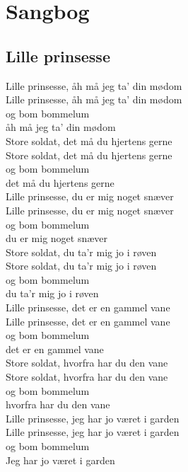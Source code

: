 \section{Sangbog}
\subsection*{Lille prinsesse}

Lille prinsesse, åh må jeg ta' din mødom \\
Lille prinsesse, åh må jeg ta' din mødom \\
og bom bommelum \\
åh må jeg ta' din mødom \\

Store soldat, det må du hjertens gerne \\
Store soldat, det må du hjertens gerne \\
og bom bommelum \\
det må du hjertens gerne \\

Lille prinsesse, du er mig noget snæver \\
Lille prinsesse, du er mig noget snæver \\
og bom bommelum \\
du er mig noget snæver \\

Store soldat, du ta'r mig jo i røven \\
Store soldat, du ta'r mig jo i røven \\
og bom bommelum \\
du ta'r mig jo i røven \\

Lille prinsesse, det er en gammel vane \\
Lille prinsesse, det er en gammel vane \\
og bom bommelum \\
det er en gammel vane \\

Store soldat, hvorfra har du den vane \\
Store soldat, hvorfra har du den vane \\
og bom bommelum \\
hvorfra har du den vane \\
 
Lille prinsesse, jeg har jo været i garden \\
Lille prinsesse, jeg har jo været i garden \\
og bom bommelum \\
Jeg har jo været i garden \\

